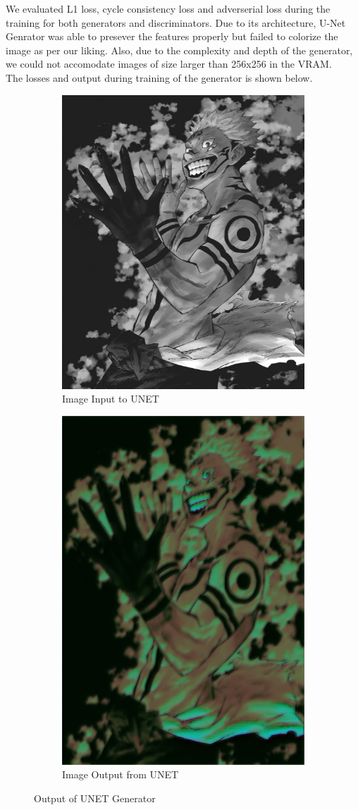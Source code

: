 We evaluated L1 loss, cycle consistency loss and adverserial loss during the training for both
generators and discriminators. Due to its architecture, U-Net Genrator was able to presever the features properly but failed to colorize the image as per our liking. Also, due to the complexity and depth of the generator, we could not accomodate images of size larger than 256x256 in the VRAM. \\
The losses and output during training of the generator is shown below.
\begin{figure}[bp]
    \centering
    \begin{subfigure}[b]{0.45\textwidth}
        \includegraphics[height=0.8\textwidth]{chapter/output/UNetInput.png}
        \caption{Image Input to UNET}
    \end{subfigure}
    \hfill
    \begin{subfigure}[b]{0.45\textwidth}
        \includegraphics[height=0.8\textwidth]{chapter/output/UNet-output.png}
        \caption{Image Output from UNET}
    \end{subfigure}
    \caption{Output of UNET Generator}
    \label{fig:Output of UNET Generator}
\end{figure}
\newpage

